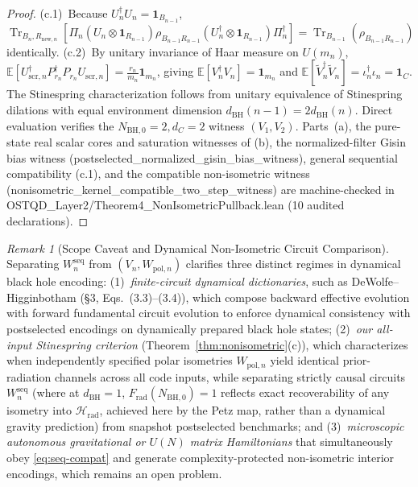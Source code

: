 \documentclass[11pt,a4paper]{article}
\theoremstyle{definition}
\theoremstyle{remark}
\newtheorem{remark}{Remark}
\newcommand{\Tr}{\operatorname{Tr}}
\newcommand{\cH}{\mathcal{H}}
\newcommand{\1}{\mathbf{1}}
\newcommand{\code}[1]{{\scriptsize\ttfamily #1}}
\begin{document}
\begin{proof}
(c.1)~Because $U_n^\dagger U_n=\1_{B_{n-1}}$, $\Tr_{B_n,R_{\mathrm{new},n}}[\Pi_n(U_n\otimes\1_{R_{n-1}})\rho_{B_{n-1}R_{n-1}}(U_n^\dagger\otimes\1_{R_{n-1}})\Pi_n^\dagger] = \Tr_{B_{n-1}}(\rho_{B_{n-1}R_{n-1}})$ identically.
(c.2)~By unitary invariance of Haar measure on $U(m_n)$, $\mathbb{E}[U_{\mathrm{scr},n}^\dagger P_{r_n}^\dagger P_{r_n} U_{\mathrm{scr},n}] = \frac{r_n}{m_n}\1_{m_n}$, giving $\mathbb{E}[V_n^\dagger V_n]=\1_{m_n}$ and $\mathbb{E}[\tilde{V}_n^\dagger\tilde{V}_n]=\iota_n^\dagger\iota_n=\1_C$. The Stinespring characterization follows from unitary equivalence of Stinespring dilations with equal environment dimension $d_{\mathrm{BH}}(n-1)=2d_{\mathrm{BH}}(n)$. Direct evaluation verifies the $N_{\mathrm{BH},0}=2,d_C=2$ witness $(V_1,V_2)$. Parts~(a), the pure-state real scalar cores and saturation witnesses of (b), the normalized-filter Gisin bias witness (\code{postselected\_\allowbreak normalized\_\allowbreak gisin\_\allowbreak bias\_\allowbreak witness}), general sequential compatibility (c.1), and the compatible non-isometric witness (\code{nonisometric\_\allowbreak kernel\_\allowbreak compatible\_\allowbreak two\_\allowbreak step\_\allowbreak witness}) are machine-checked in \code{OSTQD\_Layer2/\allowbreak Theorem4\_\allowbreak NonIsometricPullback.lean} (10 audited declarations).
\end{proof}

\begin{remark}[Scope Caveat and Dynamical Non-Isometric Circuit Comparison]\label{rem:u4-caveat}
Separating $W_n^{\mathrm{seq}}$ from $(V_n,W_{\mathrm{pol},n})$ clarifies three distinct regimes in dynamical black hole encoding: (1)~\emph{finite-circuit dynamical dictionaries}, such as DeWolfe--Higginbotham \cite{DeWolfeHigginbotham2023} (\S3, Eqs.~(3.3)--(3.4)), which compose backward effective evolution with forward fundamental circuit evolution to enforce dynamical consistency with postselected encodings on dynamically prepared black hole states; (2)~\emph{our all-input Stinespring criterion} (Theorem~\ref{thm:nonisometric}(c)), which characterizes when independently specified polar isometries $W_{\mathrm{pol},n}$ yield identical prior-radiation channels across all code inputs, while separating strictly causal circuits $W_n^{\mathrm{seq}}$ (where at $d_{\mathrm{BH}}=1$, $F_{\mathrm{rad}}(N_{\mathrm{BH},0})=1$ reflects exact recoverability of any isometry into $\cH_{\mathrm{rad}}$, achieved here by the Petz map, rather than a dynamical gravity prediction) from snapshot postselected benchmarks; and (3)~\emph{microscopic autonomous gravitational or $U(N)$ matrix Hamiltonians} that simultaneously obey \eqref{eq:seq-compat} and generate complexity-protected non-isometric interior encodings, which remains an open problem.
\end{remark}
\end{document}
